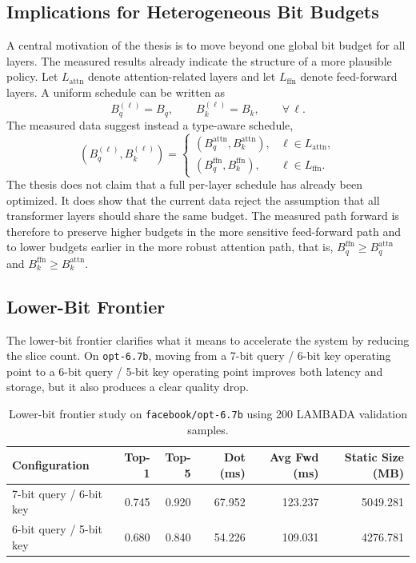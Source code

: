 \subsection{Implications for Heterogeneous Bit Budgets}
A central motivation of the thesis is to move beyond one global bit budget for all layers. The measured results already indicate the structure of a more plausible policy. Let $L_{\mathrm{attn}}$ denote attention-related layers and let $L_{\mathrm{ffn}}$ denote feed-forward layers. A uniform schedule can be written as
\begin{equation}
    B_q^{(\ell)} = B_q, \qquad B_k^{(\ell)} = B_k, \qquad \forall\,\ell.
\end{equation}
The measured data suggest instead a type-aware schedule,
\begin{equation}
    (B_q^{(\ell)}, B_k^{(\ell)}) =
    \begin{cases}
        (B_q^{\mathrm{attn}}, B_k^{\mathrm{attn}}), & \ell \in L_{\mathrm{attn}}, \\
        (B_q^{\mathrm{ffn}}, B_k^{\mathrm{ffn}}), & \ell \in L_{\mathrm{ffn}}.
    \end{cases}
\end{equation}
The thesis does not claim that a full per-layer schedule has already been optimized. It does show that the current data reject the assumption that all transformer layers should share the same budget. The measured path forward is therefore to preserve higher budgets in the more sensitive feed-forward path and to lower budgets earlier in the more robust attention path, that is, $B_q^{\mathrm{ffn}} \geq B_q^{\mathrm{attn}}$ and $B_k^{\mathrm{ffn}} \geq B_k^{\mathrm{attn}}$.

\subsection{Lower-Bit Frontier}
The lower-bit frontier clarifies what it means to accelerate the system by reducing the slice count. On \texttt{opt-6.7b}, moving from a 7-bit query / 6-bit key operating point to a 6-bit query / 5-bit key operating point improves both latency and storage, but it also produces a clear quality drop.

\begin{table}[H]
\centering
\caption{Lower-bit frontier study on \texttt{facebook/opt-6.7b} using 200 LAMBADA validation samples.}
\label{tab:67b-frontier}
\begin{tabular}{lrrrrr}
\toprule
Configuration & Top-1 & Top-5 & Dot (ms) & Avg Fwd (ms) & Static Size (MB) \\
\midrule
7-bit query / 6-bit key & 0.745 & 0.920 & 67.952 & 123.237 & 5049.281 \\
6-bit query / 5-bit key & 0.680 & 0.840 & 54.226 & 109.031 & 4276.781 \\
\bottomrule
\end{tabular}
\end{table}

